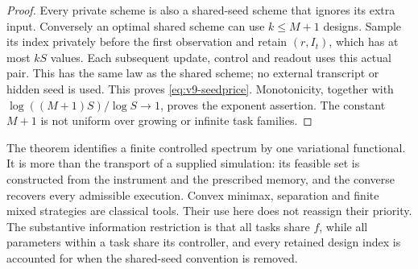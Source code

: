 \begin{proof}
Every private scheme is also a shared-seed scheme that ignores its
extra input. Conversely an optimal shared scheme can use $k\le M+1$
designs. Sample its index privately before the first observation and
retain $(r,I_t)$, which has at most $kS$ values. Each subsequent update,
control and readout uses this actual pair. This has the same law as the
shared scheme; no external transcript or hidden seed is used. This
proves \eqref{eq:v9-seedprice}. Monotonicity, together with
$\log((M+1)S)/\log S\to1$, proves the exponent assertion. The constant
$M+1$ is not uniform over growing or infinite task families.
\end{proof}

The theorem identifies a finite controlled spectrum by one variational
functional. It is more than the transport of a supplied simulation:
its feasible set is constructed from the instrument and the prescribed
memory, and the converse recovers every admissible execution. Convex
minimax, separation and finite mixed strategies are classical tools.
Their use here does not reassign their priority. The substantive
information restriction is that all tasks share $f$, while all parameters
within a task share its controller, and every retained design index is
accounted for when the shared-seed convention is removed.

